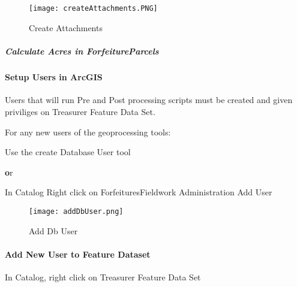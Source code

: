   \subparagraph*{}
  \begin{figure}[h!]
  \centering
      \texttt{[image: createAttachments.PNG]}
  \caption{Create Attachments}
  \end{figure}


   \subparagraph{Calculate Acres in ForfeitureParcels}


  \clearpage


  \paragraph[Setup Users in ArcGIS]{\Large Setup Users in ArcGIS\texorpdfstring{\\}{}}

  Users that will run Pre and Post processing scripts must be created and given priviliges on Treasurer Feature Data Set.
  \vspace{.35in}

  \noindent For any new users of the geoprocessing tools:

  \vspace{.15in}

  Use the create Database User tool
   \vspace{.15in}

  {\textbf or}

  \vspace{.15in}

 In Catalog {\rtArrow} Right click on ForfeituresFieldwork {\rtArrow} Administration {\rtArrow} Add User

  \vspace{.35in}

  \begin{figure}[h!]
  \centering
      \texttt{[image: addDbUser.png]}
  \caption{Add Db User}
  \end{figure}
  \clearpage
  \paragraph[Add New User to Feature Dataset]{\Large Add New User to Feature Dataset\texorpdfstring{\\}{}}
  \vspace{.35in}

  In Catalog, { \rtArrow} right click on Treasurer Feature Data Set
  \vspace{.15in}

